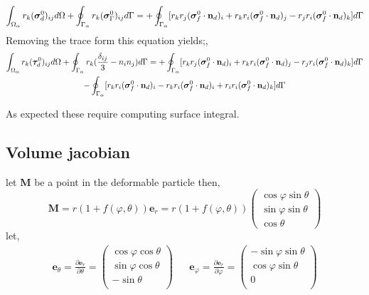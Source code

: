 \begin{multline}
    \int_{\Omega_{\alpha}}  r_{k}(\bm{\sigma}^0_d)_{ij} d\Omega
    +\oint_{\Gamma_{\alpha}}  r_{k}(\bm{\sigma}_\Gamma^0)_{ij} d\Gamma
    = 
    +\oint_{\Gamma_{\alpha}}   [r_{k}r_{j} (\bm{\sigma}_f^0\cdot\textbf{n}_d)_i
    +   r_{k}r_{i} (\bm{\sigma}_f^0\cdot\textbf{n}_d)_j
    -   r_{j}r_{i} (\bm{\sigma}_f^0\cdot\textbf{n}_d)_k]  d\Gamma
\end{multline}
Removing the trace form this equation yields;, 
\begin{multline}
    \int_{\Omega_{\alpha}}  r_{k}(\bm{\tau}^0_d)_{ij} d\Omega
    +\oint_{\Gamma_{\alpha}}  r_{k}(\frac{\delta_{ij}}{3} - n_in_j) d\Gamma
    = 
    +\oint_{\Gamma_{\alpha}}   [r_{k}r_{j} (\bm{\sigma}_f^0\cdot\textbf{n}_d)_i
    +   r_{k}r_{i} (\bm{\sigma}_f^0\cdot\textbf{n}_d)_j
    -   r_{j}r_{i} (\bm{\sigma}_f^0\cdot\textbf{n}_d)_k]  d\Gamma\\
    - \oint_{\Gamma_{\alpha}}   [r_{k}r_{i} (\bm{\sigma}_f^0\cdot\textbf{n}_d)_i
    -    r_{k}r_{i} (\bm{\sigma}_f^0\cdot\textbf{n}_d)_i
    +   r_{i}r_{i} (\bm{\sigma}_f^0\cdot\textbf{n}_d)_k]  d\Gamma
\end{multline}

As expected these require computing surface integral. 



\subsection{Volume jacobian}

let \textbf{M} be a point in the deformable particle then, 
\begin{equation}
    \textbf{M}
    =
    r(1+f(\varphi,\theta))\textbf{e}_r
    =
    r(1+f(\varphi,\theta))\begin{pmatrix}
        \cos\varphi \sin\theta\\
        \sin\varphi \sin\theta\\
        \cos\theta
    \end{pmatrix}
\end{equation}
let,
\begin{align}
    \textbf{e}_{\theta}
    =
    \frac{\partial \textbf{e}_r}{\partial \theta}
    = 
    \begin{pmatrix}
        \cos \varphi \cos\theta\\
        \sin \varphi \cos\theta\\
        -\sin\theta\\
    \end{pmatrix}
    &&
    \textbf{e}_{\varphi}
    =
    \frac{\partial \textbf{e}_r}{\partial \varphi}
    = 
    \begin{pmatrix}
        -\sin \varphi \sin\theta\\
        \cos \varphi \sin\theta\\
        0\\
    \end{pmatrix}\\
\end{align}

